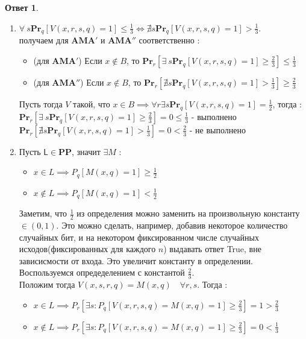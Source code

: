 \documentclass[a4paper]{article}
\theoremstyle{plain}
\theoremstyle{definition}
\newtheorem*{answer}{Ответ}
\begin{document}
\begin{answer}

\begin{enumerate}
    \item $\forall\ s \mathbf{Pr}_q [V(x,r,s,q)=1] \leq \frac{1}{3}  \Leftrightarrow \nexists s
    \mathbf{Pr}_q [V(x,r,s,q)=1] > \frac{1}{3}$. \\ 
    получаем для $\mathbf{AMA'}$ и $\mathbf{AMA''}$ соответственно :
    \begin{itemize}
      \item (для $\mathbf{AMA'}$) Если $x \notin B$, то $\mathbf{Pr}_r[\exists\ s \mathbf{Pr}_q [V(x,r,s,q)=1] \geq \frac{2}{3}] \leq \frac{1}{3}$
      \item (для $\mathbf{AMA''}$) Если $x \notin B$, то $\mathbf{Pr}_r[\nexists s \mathbf{Pr}_q [V(x,r,s,q)=1] > \frac{1}{3}] \geq \frac{2}{3}$
  \end{itemize}
      Пусть тогда $V$ такой, что $x \in B \implies \forall r \exists s \mathbf{Pr}_q [V(x,r,s,q)=1] = \frac{1}{2}$, тогда : \\
      $\mathbf{Pr}_r[\exists\ s \mathbf{Pr}_q [V(x,r,s,q)=1] \geq \frac{2}{3}] = 0 \leq \frac{1}{3}$ - выполнено \\
      $\mathbf{Pr}_r[\nexists s \mathbf{Pr}_q [V(x,r,s,q)=1] > \frac{1}{3}] = 0  < \frac{2}{3}$ - не выполнено
    \item Пусть $\textsf{L} \in \mathbf{PP}$, значит $\exists M$ : 
    \begin{itemize}
        \item $x \in L \implies P_q [M(x,q) = 1] \geq \frac{1}{2}$
        \item $x \notin L \implies P_q [M(x,q) = 1] < \frac{1}{2}$
    \end{itemize}
    Заметим, что $\frac{1}{2}$ из определения можно заменить на произвольную константу $\in (0,1)$. Это можно сделать, например, добавив некоторое количество случайных бит, и на некотором фиксированном числе случайных исходов(фиксированных для каждого $n$) выдавать ответ \textsf{True}, вне зависисмости от входа. Это увеличит константу в определении. Воспользуемся опредеделением с константой $\frac{2}{3}$. \\
    Положим тогда $V(x,s,r,q) = M(x,q) \quad \forall r,s$. Тогда :
    \begin{itemize}
        \item $x \in L \implies P_r[ \exists s : P_q[V(x,r,s,q) = M(x,q) = 1] \geq \frac{2}{3}] = 1 > \frac{2}{3}$
        \item $x \notin L \implies P_r[\exists s : P_q[V(x,r,s,q) = M(x,q) = 1] \geq \frac{2}{3}] = 0 < \frac{1}{3}$

\end{itemize}
\end{enumerate}
\end{answer}
\end{document}
